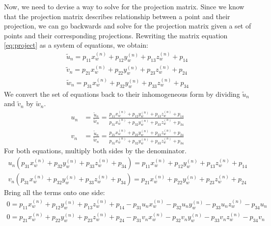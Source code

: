Now, we need to devise a way to solve for the projection matrix. Since we know that the projection matrix describes relationship between a point and their projection, we can go backwards and solve for the projection matrix given a set of points and their corresponding projections. Rewriting the matrix equation \ref{eq:project} as a system of equations, we obtain:
\begin{align*}
    \widetilde{u}_n = p_{11}x_w^{(n)} + p_{12}y_w^{(n)} + p_{13}z_w^{(n)} + p_{14} \\
    \widetilde{v}_n = p_{21}x_w^{(n)} + p_{22}y_w^{(n)} + p_{23}z_w^{(n)} + p_{24} \\
    \widetilde{w}_n = p_{31}x_w^{(n)} + p_{32}y_w^{(n)} + p_{33}z_w^{(n)} + p_{34}
\end{align*}
We convert the set of equations back to their inhomogeneous form by dividing $\widetilde{u}_n$ and $\widetilde{v}_n$ by $\widetilde{w}_n$. 
\begin{align*}
    u_n & = \frac{\widetilde{u}_n}{\widetilde{w}_n} = \frac{p_{11}x_w^{(n)} + p_{12}y_w^{(n)} + p_{13}z_w^{(n)} + p_{14}}{p_{31}x_w^{(n)} + p_{32}y_w^{(n)} + p_{33}z_w^{(n)} + p_{34}} \\
    v_n & = \frac{\widetilde{u}_n}{\widetilde{w}_n} = \frac{p_{21}x_w^{(n)} + p_{22}y_w^{(n)} + p_{23}z_w^{(n)} + p_{24}}{p_{31}x_w^{(n)} + p_{32}y_w^{(n)} + p_{33}z_w^{(n)} + p_{34}}
\end{align*}
For both equations, multiply both sides by the denominator.
\begin{align*}
    u_n(p_{31}x_w^{(n)} + p_{32}y_w^{(n)} + p_{33}z_w^{(n)} + p_{34}) = p_{11}x_w^{(n)} + p_{12}y_w^{(n)} + p_{13}z_w^{(n)} + p_{14} \\
    v_n(p_{31}x_w^{(n)} + p_{32}y_w^{ (n)} + p_{33}z_w^{(n)} + p_{34}) = p_{21}x_w^{(n)} + p_{22}y_w^{(n)} + p_{23}z_w^{(n)} + p_{24}
\end{align*}
Bring all the terms onto one side:
\begin{subequations}
    \begin{align}
        0 = p_{11}x_w^{(n)} + p_{12}y_w^{(n)} + p_{13}z_w^{(n)} + p_{14} - p_{31}u_nx_w^{(n)} - p_{32}u_ny_w^{(n)} - p_{33}u_nz_w^{(n)} - p_{34}u_n \\
        0 = p_{21}x_w^{(n)} + p_{22}y_w^{(n)} + p_{23}z_w^{(n)} + p_{24} - p_{31}v_nx_w^{(n)} - p_{32}v_ny_w^{(n)} - p_{33}v_nz_w^{(n)} - p_{34}v_n
    \end{align}
\end{subequations}



